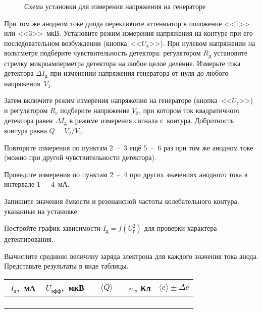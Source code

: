 \begin{lab:task}
\begin{figure}[h!]
    \caption{Схема установки для измерения напряжения на генераторе}
\end{figure}


	\item При том же анодном токе диода переключите аттенюатор в положение <<1>>
или <<3>>~мкВ. Установите режим измерения
напряжения на контуре при его последовательном возбуждении
(кнопка~<<$U_{\text{к}}$>>). При нулевом напряжении на вольтметре
подберите чувствительность детектора: регулятором $R_{\text{д}}$ установите
стрелку микроамперметра детектора на любое целое
деление. Измерьте  тока детектора $\Delta I_{\text{д}}$
при изменении напряжения генератора от нуля до любого
напряжения~$V_1$.

Затем включите режим измерения напряжения на генераторе
(кнопка~<<$U_{\text{г}}$>>) и регулятором $R_{\text{г}}$ подберите напряжение
$V_2$, при котором ток квадратичного детектора равен 
$\Delta I_{\text{д}}$ в режиме измерения сигнала с~контура.
Добротность контура равна $Q=V_2/V_1$.

	\item Повторите измерения по пунктам 2~--~3 ещё 5~--~6 раз при том же
анодном токе (можно при другой
чувствительности детектора).

	\item Проведите измерения по пунктам 2~--~4 при других значениях анодного
тока в интервале 1~--~4~мА.

	\item Запишите значения ёмкости и резонансной частоты колебательного
контура, указанные на установке.


	\item Постройте график зависимости $I_{\text{д}}=f(U^2_{\text{г}})$ для
проверки характера детектирования.

	\item Вычислите среднюю величину заряда электрона для каждого значения тока
анода. Представьте результаты в виде таблицы.

\begin{center}
\begin{tabular}{|c|c|c|c|c|}
\hline $\;I_{\text{а}}$,~мА&$\;U_{\text{эфф}}$,~мкВ&$\quad\langle
Q\rangle\quad$&$e~$, Кл&$\langle e\rangle\pm\Delta e$\\\hline\hline
 & & & &\\
 & & & &\\
 & & & &\\
 & & & &\\
\hline
\end{tabular}
\end{center}


\end{lab:task}
